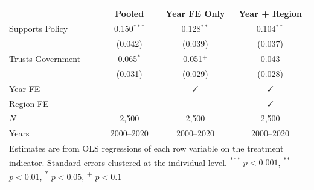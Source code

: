 \begin{tabular}{l*{3}{c}}
\toprule
 & Pooled & Year FE Only & Year + Region \\
\midrule
Supports Policy & 0.150$^{***}$ & 0.128$^{**}$ & 0.104$^{**}$ \\
 & (0.042) & (0.039) & (0.037) \\
\addlinespace
Trusts Government & 0.065$^{*}$ & 0.051$^{+}$ & 0.043 \\
 & (0.031) & (0.029) & (0.028) \\
\midrule
Year FE &  & $\checkmark$ & $\checkmark$ \\
Region FE &  &  & $\checkmark$ \\
\midrule
$N$ & 2,500 & 2,500 & 2,500 \\
Years & 2000--2020 & 2000--2020 & 2000--2020 \\
\bottomrule
\multicolumn{4}{p{\linewidth}}{\footnotesize Estimates are from OLS regressions of each row variable on the treatment indicator. Standard errors clustered at the individual level. \textsuperscript{***} $p<0.001$, \textsuperscript{**} $p<0.01$, \textsuperscript{*} $p<0.05$, \textsuperscript{+} $p<0.1$} \\
\end{tabular}
